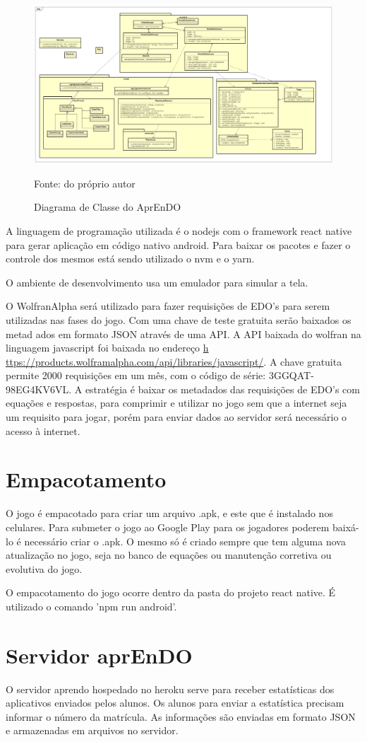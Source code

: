 \begin{figure}[H]
\centering
\caption{Diagrama de Classe do AprEnDO}
\includegraphics[scale=0.4]{figuras/diagramaClasse0_2.png}

\small{Fonte: do próprio autor}
\end{figure}


A linguagem de programação utilizada é o nodejs com o framework react native para gerar aplicação em código nativo android. Para baixar os pacotes e fazer o controle dos mesmos está sendo utilizado o nvm e o yarn.

O ambiente de desenvolvimento usa um emulador para simular a tela.

O WolfranAlpha será utilizado para fazer requisições de EDO's para serem utilizadas nas fases do jogo. Com uma chave de teste gratuita serão baixados os metad    ados em formato JSON através de uma API.
A API baixada do wolfran na linguagem javascript foi baixada no endereço \url{h    ttps://products.wolframalpha.com/api/libraries/javascript/}.
A chave gratuita permite 2000 requisições em um mês, com o código de série: 3GGQAT-98EG4KV6VL. A estratégia é baixar os metadados das requisições de EDO's com     equações e respostas, para comprimir e utilizar no jogo sem que a internet seja um requisito para jogar, porém para enviar dados ao servidor será necessário o acesso à internet.

\section[Empacotamento]{Empacotamento}
O jogo é empacotado para criar um arquivo .apk, e este que é instalado nos celulares. Para submeter o jogo ao Google Play para os jogadores poderem baixá-lo é necessário criar o .apk. O mesmo só é criado sempre que tem alguma nova atualização no jogo, seja no banco de equações ou manutenção corretiva ou evolutiva do jogo.

O empacotamento do jogo ocorre dentro da pasta do projeto react native. É utilizado o comando 'npm run android'.

\section[Servidor aprEnDO]{Servidor aprEnDO}
O servidor aprendo hospedado no heroku serve para receber estatísticas dos aplicativos enviados pelos alunos. Os alunos para enviar a estatística precisam informar o número da matrícula. As informações são enviadas em formato JSON e armazenadas em arquivos no servidor. 
